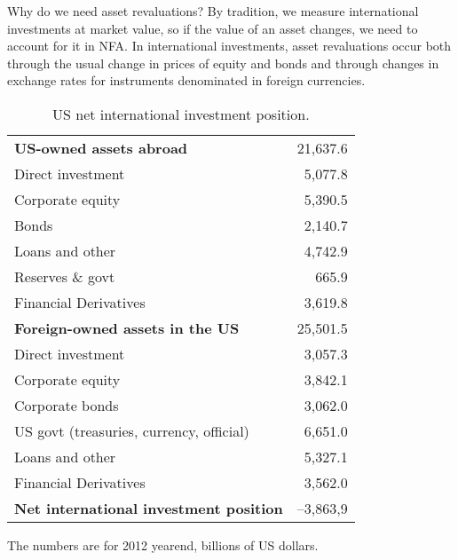 Why do we need asset revaluations?  By tradition, we
measure international investments at market value, so if the value
of an asset changes, we need to account for it in NFA.
In international investments, asset revaluations occur both through the usual change in
prices of equity and bonds and through changes in exchange rates
for instruments denominated in foreign currencies.


\begin{table}
\centering
\caption{US net international investment position.}
\begin{tabular*}{0.8\textwidth}{l@{\extracolsep{\fill}}r}
\toprule
{\bf US-owned assets abroad}  &  21,637.6 \\
\hspace{5mm}Direct investment &  5,077.8 \\
\hspace{5mm}Corporate equity &  5,390.5 \\
\hspace{5mm}Bonds\index{bond}  & 2,140.7 \\
\hspace{5mm}Loans and other &  4,742.9 \\
\hspace{5mm}Reserves \& govt &  665.9 \\
\hspace{5mm}Financial Derivatives & 3,619.8 \\
\addlinespace
{\bf Foreign-owned assets in the US} & 25,501.5 \\
\hspace{5mm}Direct investment  & 3,057.3 \\
\hspace{5mm}Corporate equity  & 3,842.1  \\
\hspace{5mm}Corporate bonds\index{bond}   &  3,062.0 \\
\hspace{5mm}US govt (treasuries, currency, official) &  6,651.0  \\
\hspace{5mm}Loans and other &  5,327.1      \\
\hspace{5mm}Financial Derivatives & 3,562.0 \\
\addlinespace
{\bf Net international investment position} &  --3,863,9  \\
\bottomrule
\end{tabular*}
\begin{minipage}{0.8\textwidth}
\footnotesize{%
\smallskip
The numbers are for 2012 yearend, billions of US dollars.}
\end{minipage}
\label{tab:usniip}
\end{table}

